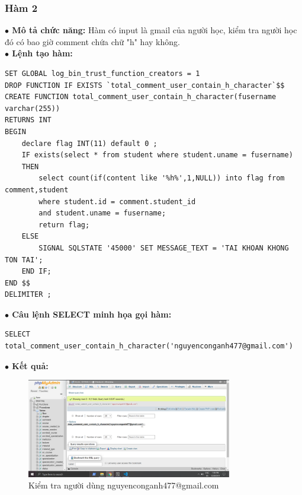 \documentclass[12pt,a4paper,titlepage]{article}
\begin{document}
\subsubsection{Hàm 2}
\textbf{$\bullet$ Mô tả chức năng:} Hàm có input là gmail của người học, kiểm tra người học đó có bao giờ comment chứa chữ "h" hay không.\\
\textbf{$\bullet$ Lệnh tạo hàm:}
\begin{lstlisting}
SET GLOBAL log_bin_trust_function_creators = 1
DROP FUNCTION IF EXISTS `total_comment_user_contain_h_character`$$
CREATE FUNCTION total_comment_user_contain_h_character(fusername varchar(255)) 
RETURNS INT
BEGIN
	declare flag INT(11) default 0 ;
	IF exists(select * from student where student.uname = fusername) 
    THEN
        select count(if(content like '%h%',1,NULL)) into flag from comment,student 
        where student.id = comment.student_id 
        and student.uname = fusername;
		return flag;
    ELSE 		
        SIGNAL SQLSTATE '45000' SET MESSAGE_TEXT = 'TAI KHOAN KHONG TON TAI';
    END IF;
END $$
DELIMITER ;
\end{lstlisting}
\textbf{$\bullet$ Câu lệnh SELECT minh họa gọi hàm:}
\begin{lstlisting}
SELECT total_comment_user_contain_h_character('nguyenconganh477@gmail.com')
\end{lstlisting}
\textbf{$\bullet$ Kết quả:}
\begin{figure}[h!]
	\centering
	\caption{Kiểm tra người dùng nguyenconganh477@gmail.com}
	\includegraphics[width=0.8\textwidth]{images/cmmt8.png}
\end{figure}
\end{document}

